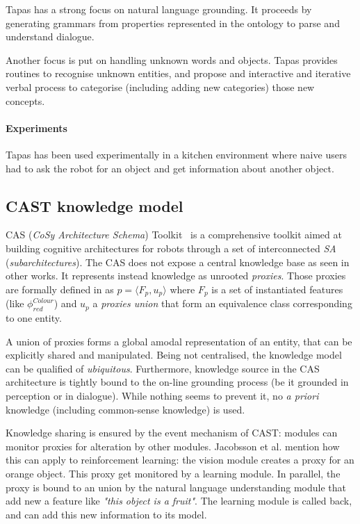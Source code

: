 \documentclass{IEEEtran}
\begin{document}
{\sc Tapas} has a strong focus on natural language grounding. It proceeds by
generating grammars from properties represented in the ontology to parse and
understand dialogue.

Another focus is put on handling unknown words and objects. {\sc Tapas}
provides routines to recognise unknown entities, and propose and interactive
and iterative verbal process to categorise (including adding new categories)
those new concepts.

\paragraph{Experiments} {\sc Tapas} has been used experimentally in a kitchen
environment where naive users had to ask the robot for an object and get
information about another object.

\subsection{CAST knowledge model}
\label{sect|cast}

CAS (\emph{CoSy Architecture Schema}) Toolkit~\cite{Hawes2007} is a
comprehensive toolkit aimed at building cognitive architectures for robots
through a set of interconnected \emph{SA} (\emph{subarchitectures}). The CAS
does not expose a central knowledge base as seen in other works. It represents
instead knowledge as unrooted \emph{proxies}. Those proxies are formally
defined in \cite{Jacobsson2008} as $p= \langle F_p, u_p \rangle$ where $F_p$ is
a set of instantiated features (like $\phi^{Colour}_{red}$) and $u_p$ a
\emph{proxies union} that form an equivalence class corresponding to one
entity.

A union of proxies forms a global amodal representation of an entity, that can
be explicitly shared and manipulated. Being not centralised, the knowledge
model can be qualified of \emph{ubiquitous}. Furthermore, knowledge source in
the CAS architecture is tightly bound to the on-line grounding process (be it
grounded in perception or in dialogue). While nothing seems to prevent it, no
{\it a priori} knowledge (including common-sense knowledge) is used.

Knowledge sharing is ensured by the event mechanism of CAST: modules can
monitor proxies for alteration by other modules. Jacobsson et al. mention how
this can apply to reinforcement learning: the vision module creates a proxy for
an orange object. This proxy get monitored by a learning module. In parallel,
the proxy is bound to an union by the natural language understanding module
that add new a feature like \emph{"this object is a fruit"}. The learning
module is called back, and can add this new information to its model.
\end{document}
